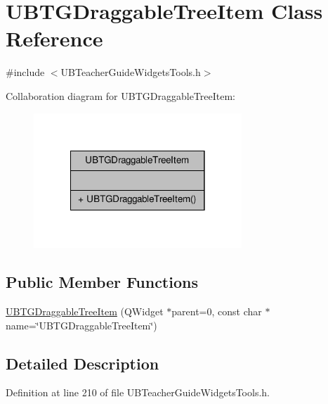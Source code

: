 \hypertarget{class_u_b_t_g_draggable_tree_item}{\section{U\-B\-T\-G\-Draggable\-Tree\-Item Class Reference}
\label{d9/d0b/class_u_b_t_g_draggable_tree_item}
}


{\ttfamily \#include $<$U\-B\-Teacher\-Guide\-Widgets\-Tools.\-h$>$}



Collaboration diagram for U\-B\-T\-G\-Draggable\-Tree\-Item\-:
\nopagebreak
\begin{figure}[H]
\begin{center}
\leavevmode
\includegraphics[width=222pt]{d2/dbd/class_u_b_t_g_draggable_tree_item__coll__graph}
\end{center}
\end{figure}
\subsection*{Public Member Functions}
\begin{DoxyCompactItemize}
\item 
\hyperlink{class_u_b_t_g_draggable_tree_item_a058e955784562b0b5734e1646a18a0ed}{U\-B\-T\-G\-Draggable\-Tree\-Item} (Q\-Widget $\ast$parent=0, const char $\ast$name=\char`\"{}U\-B\-T\-G\-Draggable\-Tree\-Item\char`\"{})
\end{DoxyCompactItemize}


\subsection{Detailed Description}


Definition at line 210 of file U\-B\-Teacher\-Guide\-Widgets\-Tools.\-h.



